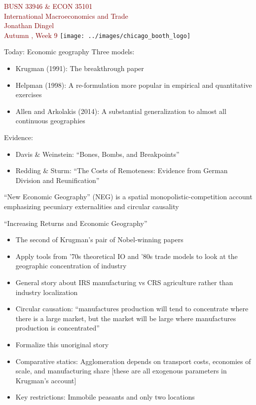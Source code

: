 \documentclass[10pt,notes=hide]{beamer}
\begin{document}
\begin{frame}[plain]
\begin{center}
\large
\textcolor{maroon}{BUSN 33946 \& ECON 35101\\
International Macroeconomics and Trade\\ 
Jonathan Dingel\\
Autumn \the\year, Week 9}
\vfill 
\texttt{[image: ../images/chicago\_booth\_logo]}
\end{center}
\end{frame}
\begin{frame}{Today: Economic geography}
Three models:
\begin{itemize}
	\item Krugman (1991): The breakthrough paper
	\item Helpman (1998): A re-formulation more popular in empirical and quantitative exercises
	\item Allen and Arkolakis (2014): A substantial generalization to almost all continuous geographies
\end{itemize}
Evidence:
\begin{itemize}
	\item Davis \& Weinstein: ``Bones, Bombs, and Breakpoints''
	\item Redding \& Sturm: ``The Costs of Remoteness: Evidence from German Division and Reunification''
\end{itemize}
``New Economic Geography'' (NEG) is a spatial monopolistic-competition account emphasizing pecuniary externalities and circular causality
\end{frame}
\begin{frame}{``Increasing Returns and Economic Geography''}
\begin{itemize}
	\item The second of Krugman's pair of Nobel-winning papers
	\item Apply tools from '70s theoretical IO and '80s trade models to look at the geographic concentration of industry
	\item General story about IRS manufacturing vs CRS agriculture rather than industry localization
	\item Circular causation: ``manufactures production will tend to concentrate where there is a large market, but the market will be large where manufactures production is concentrated''
	\item Formalize this unoriginal story
	\item Comparative statics: Agglomeration depends on transport costs, economies of scale, and manufacturing share [these are all exogenous parameters in Krugman's account]
	\item Key restrictions: Immobile peasants and only two locations
\end{itemize}
\end{frame}
\end{document}

